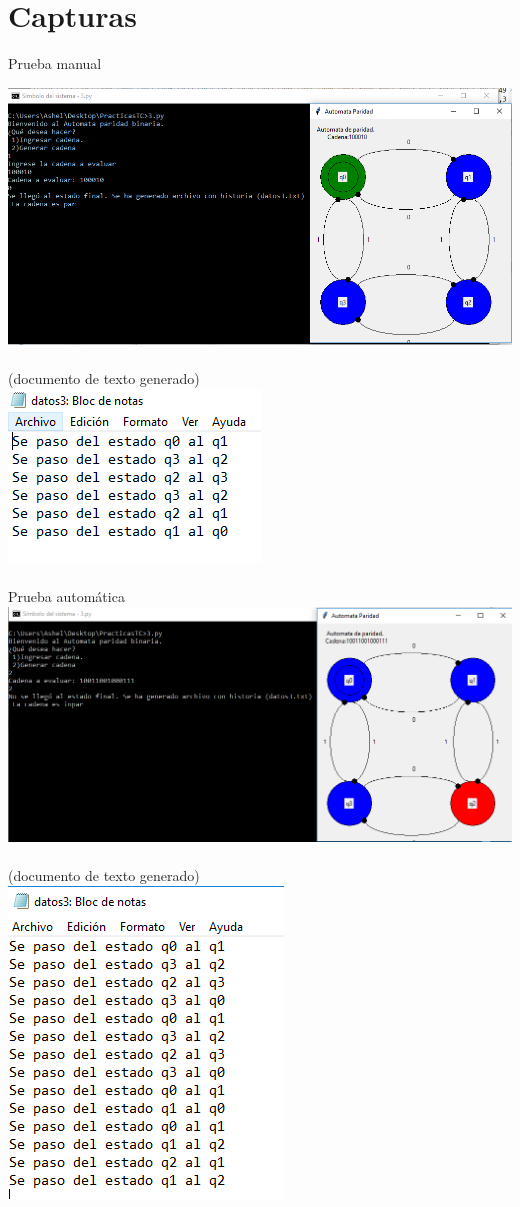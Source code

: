 \documentclass[a4paper, 12pt, oneside]{article}
\begin{document}
\section{Capturas}

Prueba manual
 
\includegraphics[width=1.2\textwidth]{30.PNG}\\
\\
\clearpage
(documento de texto generado)\\
\includegraphics{31.PNG}
\\\\
Prueba automática\\
 
\includegraphics[width=1.2\textwidth]{32.PNG}\\
\\\clearpage
(documento de texto generado)\\
\includegraphics{33.PNG}
\end{document}
